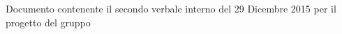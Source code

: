 Documento contenente il secondo verbale interno del 29 Dicembre 2015 per il progetto \progetto del gruppo \gruppo

